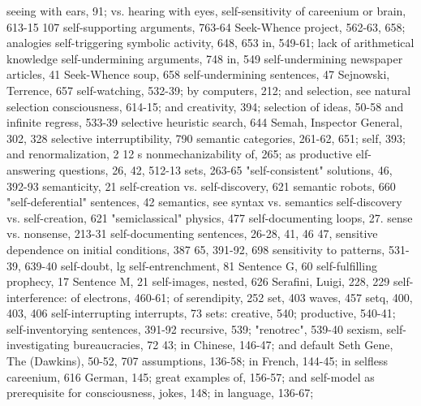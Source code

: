 seeing with ears, 91; vs. hearing with eyes,         self-sensitivity of careenium or brain, 613-15
 107                                                 self-supporting arguments, 763-64
Seek-Whence project, 562-63, 658; analogies          self-triggering symbolic activity, 648, 653
 in, 549-61; lack of arithmetical knowledge          self-undermining arguments, 748
 in, 549                                             self-undermining newspaper articles, 41
Seek-Whence soup, 658                                self-undermining sentences, 47
Sejnowski, Terrence, 657                             self-watching, 532-39; by computers, 212; and
selection, see natural selection                      consciousness, 614-15; and creativity, 394;
selection of ideas, 50-58                             and infinite regress, 533-39
selective heuristic search, 644                      Semah, Inspector General, 302, 328
selective interruptibility, 790                      semantic categories, 261-62, 651;
self, 393; and renormalization, 2 12 s                nonmechanizability of, 265; as productive
elf-answering questions, 26, 42, 512-13               sets, 263-65
"self-consistent" solutions, 46, 392-93              semanticity, 21
self-creation vs. self-discovery, 621                semantic robots, 660
"self-deferential" sentences, 42                     semantics, see syntax vs. semantics
self-discovery vs. self-creation, 621                 "semiclassical" physics, 477
self-documenting loops, 27.                          sense vs. nonsense, 213-31
self-documenting sentences, 26-28, 41, 46 47,        sensitive dependence on initial conditions, 387
 65, 391-92, 698                                     sensitivity to patterns, 531-39, 639-40
self-doubt, lg self-entrenchment, 81                  Sentence G, 60
self-fulfilling prophecy, 17                         Sentence M, 21
self-images, nested, 626                             Serafini, Luigi, 228, 229
self-interference: of electrons, 460-61; of          serendipity, 252 set, 403
 waves, 457                                          setq, 400, 403, 406
self-interrupting interrupts, 73                     sets: creative, 540; productive, 540-41;
self-inventorying sentences, 391-92                   recursive, 539; "renotrec", 539-40 sexism,
self-investigating bureaucracies, 72                  43; in Chinese, 146-47; and default
Seth Gene, The (Dawkins), 50-52, 707                  assumptions, 136-58; in French, 144-45; in
selfless careenium, 616                               German, 145; great examples of, 156-57; and
self-model as prerequisite for consciousness,         jokes, 148; in language, 136-67;
